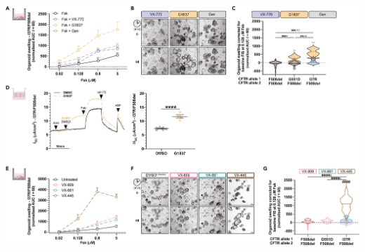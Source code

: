 \begin{center}
\includegraphics[width=\textwidth]{figures/I37R/rectal_organoids_response.jpg}
\label{I37R_figure2}
\end{center}
\begingroup
